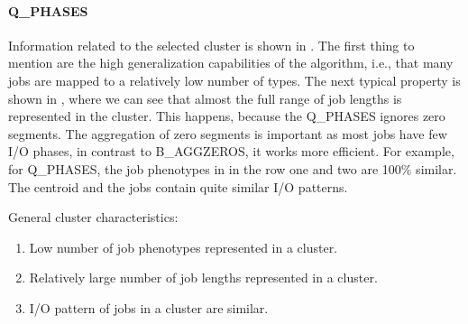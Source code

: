 \documentclass{jhps}
\begin{document}
\paragraph{Q\_PHASES}
Information related to the selected cluster is shown in .
The first thing to mention are the high generalization capabilities of the algorithm, i.e., that many jobs are mapped to a relatively low number of types.
The next typical property is shown in , where we can see that almost the full range of job lengths is represented in the cluster.
This happens, because the Q\_PHASES ignores zero segments.
The aggregation of zero segments is important as most jobs have few I/O phases, in contrast to B\_AGGZEROS, it works more efficient.
For example, for Q\_PHASES, the job phenotypes in  in the row one and two are 100$\%$ similar.
The centroid and the jobs contain quite similar I/O patterns.

General cluster characteristics:
\begin{enumerate}
 \item Low number of job phenotypes represented in a cluster.
 \item Relatively large number of job lengths represented in a cluster.
 \item I/O pattern of jobs in a cluster are similar.
\end{enumerate}
\end{document}
